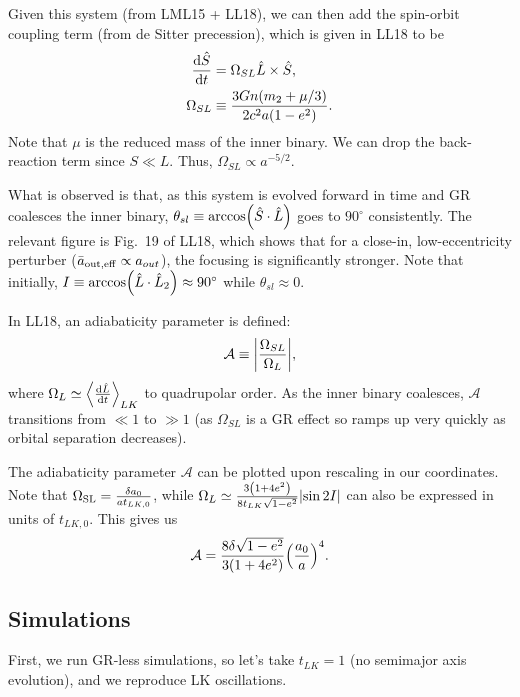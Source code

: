 \documentclass[11pt,
        usenames, %
        dvipsnames %
    ]{article}
\newcommand*{\rd}[2]{\frac{\mathrm{d}#1}{\mathrm{d}#2}}
\DeclarePairedDelimiter\abs{\lvert}{\rvert}
\DeclarePairedDelimiter\ev{\langle}{\rangle}
\DeclarePairedDelimiter\p{\lparen}{\rparen}
\begin{document}
Given this system (from LML15 + LL18), we can then add the spin-orbit coupling
term (from de Sitter precession), which is given in LL18 to be
\begin{align}
    \rd{\hat{S}}{t} &= \Omega_{SL}\hat{L} \times \hat{S},\\
    \Omega_{SL} &\equiv \frac{3Gn\p*{m_2 + \mu/3}}{2c^2a\p*{1 - e^2}}.
\end{align}
Note that $\mu$ is the reduced mass of the inner binary. We can drop the
back-reaction term since $S \ll L$. Thus, $\Omega_{SL} \propto a^{-5/2}$.

What is observed is that, as this system is evolved forward in time and GR
coalesces the inner binary, $\theta_{sl} \equiv \arccos\p*{\hat{S} \cdot
\hat{L}}$ goes to $90^\circ$ consistently. The relevant figure is Fig.~19 of
LL18, which shows that for a close-in, low-eccentricity perturber ($\bar{a}_{\rm
out, eff} \propto a_{out}$), the focusing is significantly stronger. Note that
initially, $I \equiv \arccos\p*{\hat{L} \cdot \hat{L}_2} \approx 90^\circ$ while
$\theta_{sl} \approx 0$.

In LL18, an adiabaticity parameter is defined:
\begin{equation}
    \mathcal{A} \equiv \abs*{\frac{\Omega_{SL}}{\Omega_L}},
\end{equation}
where $\Omega_{L} \simeq \ev*{\rd{\hat{L}}{t}}_{LK}$ to quadrupolar order. As
the inner binary coalesces, $\mathcal{A}$ transitions from $\ll 1$ to $\gg 1$
(as $\Omega_{SL}$ is a GR effect so ramps up very quickly as orbital separation
decreases).

The adiabaticity parameter $\mathcal{A}$ can be plotted upon rescaling in our
coordinates. Note that $\Omega_{\rm SL} = \frac{\delta a_0}{at_{LK, 0}}$, while
$\Omega_L \simeq \frac{3\p*{1 + 4e^2}}{8t_{LK}\sqrt{1 - e^2}}\abs*{\sin 2I}$ can
also be expressed in units of $t_{LK, 0}$. This gives us
\begin{equation}
    \mathcal{A} = \frac{8\delta \sqrt{1 - e^2}}{3\p*{1 +
        4e^2}}\p*{\frac{a_0}{a}}^4.
\end{equation}

\subsection{Simulations}

First, we run GR-less simulations, so let's take $t_{LK} = 1$ (no semimajor axis
evolution), and we reproduce LK oscillations.
\end{document}
